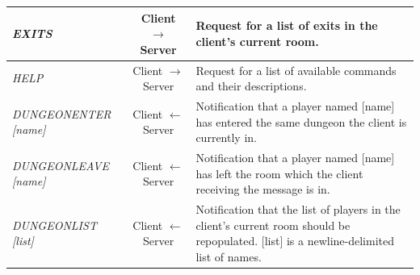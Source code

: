 \documentclass[a4paper]{article}
\begin{document}
\begin{appendices}
\begin{longtable}{|l|c|p{8 cm}|}
\hline
\textit{EXITS} & Client $\rightarrow$ Server & Request for a list of exits in the client's current room.\\
\hline
\textit{HELP} & Client $\rightarrow$ Server & Request for a list of available commands and their descriptions.\\
\hline
\textit{DUNGEONENTER [name]} & Client $\leftarrow$ Server & Notification that a player named [name] has entered the same dungeon the client is currently in.\\
\hline
\textit{DUNGEONLEAVE [name]} & Client $\leftarrow$ Server & Notification that a player named [name] has left the room which the client receiving the message is in.\\
\hline
\textit{DUNGEONLIST [list]} & Client $\leftarrow$ Server & Notification that the list of players in the client's current room should be repopulated. [list] is a newline-delimited list of names.\\
\hline
\end{longtable}
\end{appendices}
\end{document}
